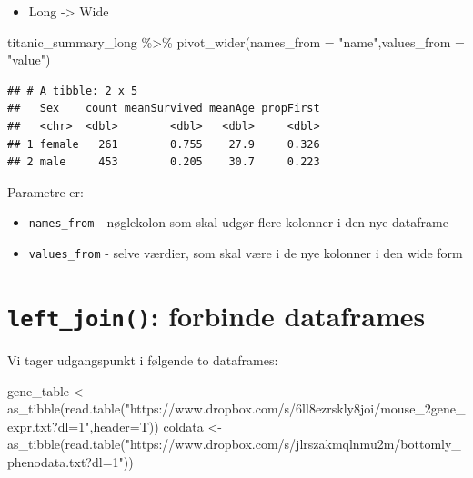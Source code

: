 \documentclass[
]{book}
\newenvironment{Shaded}{\begin{snugshade}}{\end{snugshade}}
\newcommand{\AttributeTok}[1]{\textcolor[rgb]{0.77,0.63,0.00}{#1}}
\newcommand{\FunctionTok}[1]{\textcolor[rgb]{0.00,0.00,0.00}{#1}}
\newcommand{\NormalTok}[1]{#1}
\newcommand{\OtherTok}[1]{\textcolor[rgb]{0.56,0.35,0.01}{#1}}
\newcommand{\SpecialCharTok}[1]{\textcolor[rgb]{0.00,0.00,0.00}{#1}}
\newcommand{\StringTok}[1]{\textcolor[rgb]{0.31,0.60,0.02}{#1}}
\providecommand{\tightlist}{%
  \setlength{\itemsep}{0pt}\setlength{\parskip}{0pt}}
\begin{document}
\begin{itemize}
\tightlist
\item
  Long -\textgreater{} Wide
\end{itemize}

\begin{Shaded}
\begin{Highlighting}[]
\NormalTok{titanic\_summary\_long }\SpecialCharTok{\%\textgreater{}\%}
  \FunctionTok{pivot\_wider}\NormalTok{(}\AttributeTok{names\_from =} \StringTok{"name"}\NormalTok{,}\AttributeTok{values\_from =} \StringTok{"value"}\NormalTok{)}
\end{Highlighting}
\end{Shaded}

\begin{verbatim}
## # A tibble: 2 x 5
##   Sex    count meanSurvived meanAge propFirst
##   <chr>  <dbl>        <dbl>   <dbl>     <dbl>
## 1 female   261        0.755    27.9     0.326
## 2 male     453        0.205    30.7     0.223
\end{verbatim}

Parametre er:

\begin{itemize}
\tightlist
\item
  \texttt{names\_from} - nøglekolon som skal udgør flere kolonner i den nye dataframe
\item
  \texttt{values\_from} - selve værdier, som skal være i de nye kolonner i den wide form
\end{itemize}

\hypertarget{left_join-forbinde-dataframes}{%
\section{\texorpdfstring{\texttt{left\_join()}: forbinde dataframes}{left\_join(): forbinde dataframes}}\label{left_join-forbinde-dataframes}}

Vi tager udgangspunkt i følgende to dataframes:

\begin{Shaded}
\begin{Highlighting}[]
\NormalTok{gene\_table }\OtherTok{\textless{}{-}} \FunctionTok{as\_tibble}\NormalTok{(}\FunctionTok{read.table}\NormalTok{(}\StringTok{"https://www.dropbox.com/s/6ll8ezrskly8joi/mouse\_2gene\_expr.txt?dl=1"}\NormalTok{,}\AttributeTok{header=}\NormalTok{T))}
\NormalTok{coldata }\OtherTok{\textless{}{-}} \FunctionTok{as\_tibble}\NormalTok{(}\FunctionTok{read.table}\NormalTok{(}\StringTok{"https://www.dropbox.com/s/jlrszakmqlnmu2m/bottomly\_phenodata.txt?dl=1"}\NormalTok{))}
\end{Highlighting}
\end{Shaded}
\end{document}
